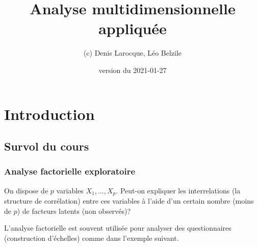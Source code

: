 \documentclass[
  11pt,
  letterpaper,
]{book}
\title{Analyse multidimensionnelle appliquée}
\author{(c) Denis Larocque, Léo Belzile}
\date{version du 2021-01-27}
\theoremstyle{definition}
\theoremstyle{definition}
\theoremstyle{definition}
\theoremstyle{remark}
\begin{document}
\maketitle

{
\setcounter{tocdepth}{1}
\tableofcontents
}
\hypertarget{introduction}{%
\chapter{Introduction}\label{introduction}}

\newcommand{\bs}[1]{\boldsymbol{#1}}
\newcommand{\eps}{\varepsilon}
\newcommand{\Rlang}{\textsf{R}}
\newcommand{\SAS}{\textsf{SAS}}
\newcommand{\Sp}{\mathscr{S}}
\renewcommand{\P}[1]{{\mathsf P}\left(#1\right)}
\newcommand{\E}[1]{{\mathsf E}\left(#1\right)}
\newcommand{\Va}[1]{{\mathsf{Var}}\left(#1\right)}
\newcommand{\Cor}[1]{{\mathsf{Cor}}\left(#1\right)}
\newcommand{\I}[1]{{\mathbf 1}_{#1}}
\newcommand{\expit}{\mathrm{expit}}
\newcommand{\logit}{\mathrm{logit}}
\newcommand{\code}[1]{\texttt{#1}}
\newcommand{\Hy}{\mathcal{H}}
\renewcommand{\d}{\mathrm{d}}

\hypertarget{survol-du-cours}{%
\section{Survol du cours}\label{survol-du-cours}}

\hypertarget{analyse-factorielle-exploratoire}{%
\subsection{Analyse factorielle exploratoire}\label{analyse-factorielle-exploratoire}}

On dispose de \(p\) variables \(X_1, \ldots, X_p\). Peut-on expliquer les interrelations (la structure de corrélation) entre ces variables à l'aide d'un certain nombre (moins de \(p\)) de facteurs latents (non observés)?

L'analyse factorielle est souvent utilisée pour analyser des questionnaires (construction d'échelles) comme dans l'exemple suivant.
\end{document}
